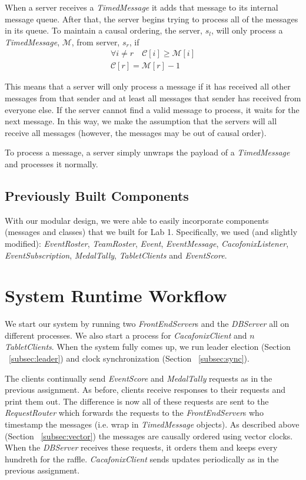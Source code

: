 \documentclass[11pt]{article}
\begin{document}
When a server receives a \emph{TimedMessage} it adds that message to
its internal message queue. After that, the server begins trying to
process all of the messages in its queue.  To maintain a causal
ordering, the server, $s_l$, will only process a \emph{TimedMessage},
$\mathcal{M}$, from server, $s_r$, if
\begin{align*}
 \forall i \ne r \quad \mathcal{C}[i] \ge \mathcal{M}[i] \\
 \mathcal{C}[r] = \mathcal{M}[r] - 1
\end{align*}

This means that a server will only process a message if it has
received all other messages from that sender and at least all messages
that sender has received from everyone else.  If the server cannot
find a valid message to process, it waits for the next message. In
this way, we make the assumption that the servers will all receive all
messages (however, the messages may be out of causal order).

To process a message, a server simply unwraps the payload of a
\emph{TimedMessage} and processes it normally.

\subsection{Previously Built Components}
With our modular design, we were able to easily incorporate components
(messages and classes) that we built for Lab 1.  Specifically, we used
(and slightly modified): \emph{EventRoster}, \emph{TeamRoster},
\emph{Event}, \emph{EventMessage}, \emph{CacofonixListener},
\emph{EventSubscription}, \emph{MedalTally}, \emph{TabletClients}
and \emph{EventScore}.

\section{System Runtime Workflow}
We start our system by running two \emph{FrontEndServer}s and the
\emph{DBServer} all on different processes.  We also start a process
for \emph{CacafonixClient} and $n$ \emph{TabletClients}.  When the system
fully comes up, we run leader election (Section ~\ref{subsec:leader})
and clock synchronization (Section ~\ref{subsec:sync}).

The clients continually send \emph{EventScore} and \emph{MedalTally}
requests as in the previous assignment. As before, clients receive
responses to their requests and print them out. The difference is now
all of these requests are sent to the \emph{RequestRouter} which
forwards the requests to the \emph{FrontEndServer}s who timestamp the
messages (i.e. wrap in \emph{TimedMessage} objects).  As described
above (Section ~\ref{subsec:vector}) the messages are causally ordered
using vector clocks.  When the \emph{DBServer} receives these
requests, it orders them and keeps every hundreth for the raffle.
\emph{CacafonixClient} sends updates periodically as in the previous
assignment.
\end{document}
